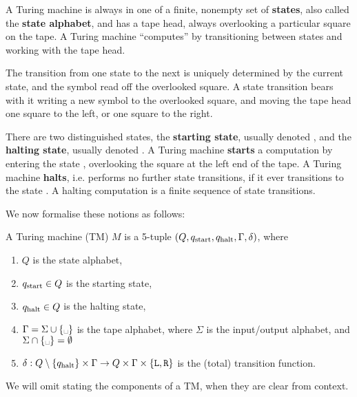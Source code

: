 A Turing machine is always in one of a finite, nonempty set of \textbf{states},
also called the \textbf{state alphabet}, and has a tape head, always
overlooking a particular square on the tape. A Turing machine ``computes'' by
transitioning between states and working with the tape head.

The transition from one state to the next is uniquely determined by the current
state, and the symbol read off the overlooked square. A state transition bears
with it writing a new symbol to the overlooked square, and moving the tape head
one square to the left, or one square to the right.

There are two distinguished states, the \textbf{starting state}, usually
denoted \qstart, and the \textbf{halting state}, usually denoted \qhalt. A
Turing machine \textbf{starts} a computation by entering the state \qstart,
overlooking the square at the left end of the tape. A Turing machine
\textbf{halts}, i.e.  performs no further state transitions, if it ever
transitions to the state \qhalt. A halting computation is a finite sequence of
state transitions.

We now formalise these notions as follows:

\begin{definition} A Turing machine (TM) $M$ is a 5-tuple $\mathopen{}\left({Q, q_{\text{start}},
q_{\text{halt}}, \Gamma, \delta}\right)\mathclose{}$, where

\begin{enumerate}

\item $Q$ is the state alphabet,

\item $q_{\text{start}} \in Q$ is the starting state,

\item $q_{\text{halt}} \in Q$ is the halting state,

\item $\Gamma = \Sigma \cup \set{\blank}$ is the tape alphabet, where $\Sigma$
is the input/output alphabet, and $\Sigma \cap \set{\blank} = \emptyset$

\item $\delta : Q \setminus \mathopen{}\left\{{q_{\text{halt}}}\right\}\mathclose{} \times \Gamma \rightarrow Q \times
\Gamma \times \mathopen{}\left\{{\mathtt{L}, \mathtt{R}}\right\}\mathclose{}$ is the (total) transition function.

\end{enumerate}

We will omit stating the components of a TM, when they are clear from context.

\end{definition}

